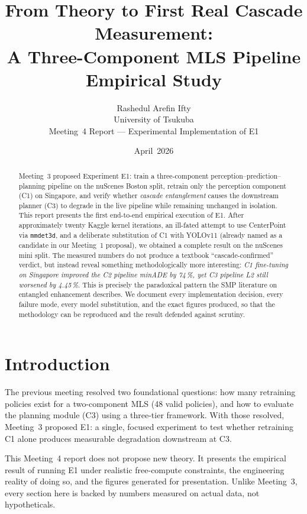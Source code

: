 \documentclass[11pt,a4paper]{article}
\title{From Theory to First Real Cascade Measurement:\\
A Three-Component MLS Pipeline Empirical Study}
\author{Rashedul Arefin Ifty\\
        University of Tsukuba\\[2pt]
        \small Meeting~4 Report --- Experimental Implementation of E1}
\date{April~2026}
\begin{document}
\maketitle

\begin{abstract}
Meeting~3 proposed Experiment E1: train a three-component
perception--prediction--planning pipeline on the nuScenes Boston split,
retrain only the perception component (C1) on Singapore, and verify
whether \emph{cascade entanglement} causes the downstream planner (C3)
to degrade in the live pipeline while remaining unchanged in isolation.
This report presents the first end-to-end empirical execution of E1.
After approximately twenty Kaggle kernel iterations, an ill-fated
attempt to use CenterPoint via \texttt{mmdet3d}, and a deliberate
substitution of C1 with YOLOv11 (already named as a candidate in our
Meeting~1 proposal), we obtained a complete result on the nuScenes
mini split. The measured numbers do not produce a textbook
``cascade-confirmed'' verdict, but instead reveal something
methodologically more interesting: \emph{C1 fine-tuning on Singapore
improved the C2 pipeline minADE by 74\,\%, yet C3 pipeline L2 still
worsened by 4.45\,\%}. This is precisely the paradoxical pattern the
SMP literature on entangled enhancement describes. We document every
implementation decision, every failure mode, every model substitution,
and the exact figures produced, so that the methodology can be
reproduced and the result defended against scrutiny.
\end{abstract}

\section{Introduction}

The previous meeting resolved two foundational questions: how many
retraining policies exist for a two-component MLS (48 valid policies),
and how to evaluate the planning module (C3) using a three-tier
framework. With those resolved, Meeting~3 proposed E1: a single,
focused experiment to test whether retraining C1 alone produces
measurable degradation downstream at C3.

This Meeting~4 report does not propose new theory. It presents the
empirical result of running E1 under realistic free-compute
constraints, the engineering reality of doing so, and the figures
generated for presentation. Unlike Meeting~3, every section here is
backed by numbers measured on actual data, not hypotheticals.
\end{document}
